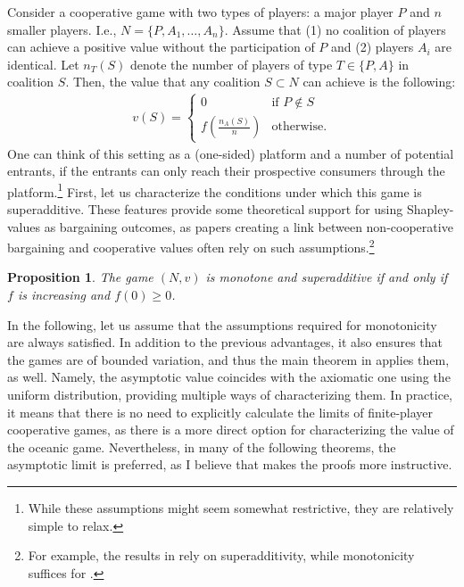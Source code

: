\documentclass[a4paper]{article}
\newtheorem{proposition}{Proposition}
\begin{document}
Consider a cooperative game with two types of players: a major player $P$ and $n$ smaller players.
I.e., $N = \{P, A_1, \dots, A_n\}$.
Assume that (1) no coalition of players can achieve a positive value without the participation of $P$ and (2) players $A_i$ are identical.
Let $n_T(S)$ denote the number of players of type $T \in \{P, A\}$ in coalition $S$.
Then, the value that any coalition $S \subset N$ can achieve is the following:
\begin{align*}
    v(S) = \begin{cases}
        0                              & \text{if } P \notin S \\
        f\left(\frac{n_A(S)}{n}\right) & \text{otherwise}.
    \end{cases}
\end{align*}
One can think of this setting as a (one-sided) platform and a number of potential entrants, if the entrants can only reach their prospective consumers through the platform.\footnote{
    While these assumptions might seem somewhat restrictive, they are relatively simple to relax.
}
First, let us characterize the conditions under which this game is superadditive.
These features provide some theoretical support for using Shapley-values as bargaining outcomes, as papers creating a link between non-cooperative bargaining and cooperative values often rely on such assumptions.\footnote{
    For example, the results in \textcite{gul1989bargaining} rely on superadditivity, while monotonicity suffices for \textcite[]{hart1996bargaining}.
}

\begin{proposition}
    \label{prop:monotone}
    The game $(N, v)$ is monotone and superadditive if and only if $f$ is increasing and $f(0) \geq 0$. %
\end{proposition}

In the following, let us assume that the assumptions required for monotonicity are always satisfied.
In addition to the previous advantages, it also ensures that the games are of bounded variation, and thus the main theorem in \textcite{fogelman1980asymptotic} applies them, as well.
Namely, the asymptotic value coincides with the axiomatic one using the uniform distribution, providing multiple ways of characterizing them.
In practice, it means that there is no need to explicitly calculate the limits of finite-player cooperative games, as there is a more direct option for characterizing the value of the oceanic game.
Nevertheless, in many of the following theorems, the asymptotic limit is preferred, as I believe that makes the proofs more instructive.
\end{document}
